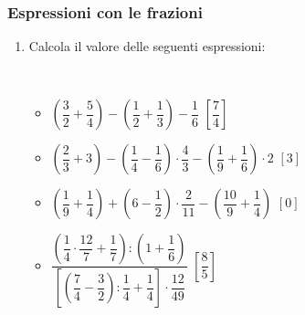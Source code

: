 \documentclass[]{beamer}
\theoremstyle{plain}
\begin{document}
\begin{frame}
\frametitle{Espressioni con le frazioni}
\begin{enumerate}
  \item Calcola il valore delle seguenti espressioni:
  
  ~
    \begin{itemize}
        \item $ \left( \dfrac{3}{2} + \dfrac{5}{4} \right) - \left( \dfrac{1}{2} + \dfrac{1}{3} \right) - \dfrac{1}{6} $
        \hspace{\fill}$ \left[ \dfrac{7}{4} \right] $

        \vspace*{.5cm}
        \item $ \left( \dfrac{2}{3} + 3 \right) - \left( \dfrac{1}{4} - \dfrac{1}{6} \right) \cdot \dfrac{4}{3} - \left( \dfrac{1}{9} + \dfrac{1}{6} \right) \cdot 2 $
        \hspace{\fill}$ \left[ 3 \right] $
        
        \vspace*{.5cm}
        \item $ \left( \dfrac{1}{9} + \dfrac{1}{4} \right) + \left( 6 - \dfrac{1}{2} \right) \cdot \dfrac{2}{11} - \left( \dfrac{10}{9} + \dfrac{1}{4} \right) $
        \hspace{\fill}$ \left[ 0 \right] $

        \vspace*{.5cm}
        \item $ \dfrac{\left( \dfrac{1}{4} \cdot \dfrac{12}{7} + \dfrac{1}{7} \right) : \left( 1 + \dfrac{1}{6} \right)}{\left[ \left( \dfrac{7}{4} - \dfrac{3}{2} \right) : \dfrac{1}{4} + \dfrac{1}{4} \right] \cdot \dfrac{12}{49}} $
        \hspace{\fill}$ \left[ \dfrac{8}{5} \right] $
    \end{itemize}
\end{enumerate}
\end{frame}
\end{document}
